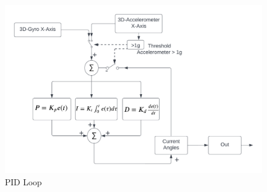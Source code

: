 \begin{figure}[H]
  \begin{center}
    \includegraphics[width=1\linewidth]{content/images/PID_Loop.png}
    \caption{PID Loop}
  \end{center}
\end{figure}


  
